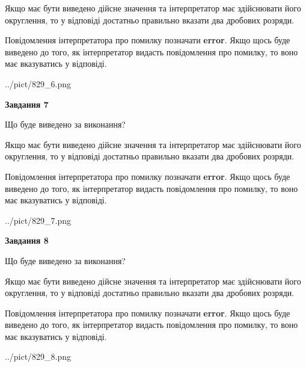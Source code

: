 \documentclass[12pt, ukrainian]{article}
\begin{document}
{\begin {Large}
Якщо має бути виведено дійсне значення та інтерпретатор має здійснювати його округлення, 
то у відповіді достатньо правильно вказати два дробових розряди.

Повідомлення інтерпретатора про помилку позначати \textbf{error}.
Якщо щось буде виведено до того, як інтерпретатор видасть повідомлення про помилку, 
то воно має вказуватись у відповіді. \par

\begin{center}
	{../pict/829_6.png}
\end{center}
\newpage

{\begin {center}\textbf{Завдання 7}\end {center}}\par
Що буде виведено за виконання? \par

Якщо має бути виведено дійсне значення та інтерпретатор має здійснювати його округлення, 
то у відповіді достатньо правильно вказати два дробових розряди.

Повідомлення інтерпретатора про помилку позначати \textbf{error}.
Якщо щось буде виведено до того, як інтерпретатор видасть повідомлення про помилку, 
то воно має вказуватись у відповіді. \par

\begin{center}
	{../pict/829_7.png}
\end{center}
\newpage

{\begin {center}\textbf{Завдання 8}\end {center}}\par
Що буде виведено за виконання? \par

Якщо має бути виведено дійсне значення та інтерпретатор має здійснювати його округлення, 
то у відповіді достатньо правильно вказати два дробових розряди.

Повідомлення інтерпретатора про помилку позначати \textbf{error}.
Якщо щось буде виведено до того, як інтерпретатор видасть повідомлення про помилку, 
то воно має вказуватись у відповіді. \par

\begin{center}
	{../pict/829_8.png}
\end{center}
\newpage


\end{Large}}
\end{document}
